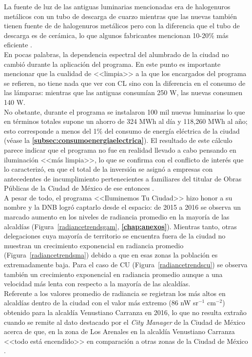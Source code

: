 La fuente de luz de las antiguas luminarias mencionadas era de halogenuros metálicos con un tubo de descarga de cuarzo mientras que las nuevas también tienen fuente de de halogenuros metálicos pero con la diferencia que el tubo de descarga es de cerámica, lo que algunos fabricantes mencionan 10-20\% más eficiente \citep{EMB2007}.\\

En pocas palabras, la dependencia espectral del alumbrado de la ciudad no cambió durante la aplicación del programa. En este punto es importante mencionar que la cualidad de <<limpia>> a la que los encargados del programa se refieren, no tiene nada que ver con CL sino con la diferencia en el consumo de las lámparas: mientras que las antiguas consumían 250 W, las nuevas consumen 140 W.\\ 

No obstante, durante el programa se instalaron 100 mil nuevas luminarias lo que en términos totales supone un ahorro de 324 MWh al día y 118,260 MWh al año; esto corresponde a menos del 1\% del consumo de energía eléctrica de la ciudad (véase la \textbf{\autoref{subsec:consumoenergiaelectrica}}). El resultado de este cálculo parece indicar que el programa no fue en realidad llevado a cabo pensando en iluminación <<más limpia>>, lo que se confirma con el conflicto de interés que lo caracterizó, en que el total de la inversión se asignó a empresas con antecedentes de incumplimiento pertenecientes a familiares del titular de Obras Públicas de la Ciudad de México de ese entonces \citep{Sinembargo2015}.\\ 

A pesar de todo, el programa <<Iluminemos Tu Ciudad>> hizo honor a su nombre y la DNB logró captarlo desde el espacio: de 2015 a 2016 se observa un marcado aumento en los niveles de radiancia promedio en la mayoría de las alcaldías (Figura~\ref{radiancetrendsgam}, \textbf{\autoref{chap:anexos}}). Mientras tanto, otras delegaciones cuya mayoría de territorio se encuentra fuera de la ciudad no muestran un crecimiento exponencial en radiancia promedio (Figura~\ref{radiancetrendsma}) debido a que en esas zonas la población es extremadamente baja. Para el caso de CU (Figura~\ref{radiancetrendscu}) se observa también un crecimiento exponencial en radiancia promedio aunque a una velocidad más lenta con respecto a la mayoría de las alcaldías.\\ 


Referente a los valores promedio de radiancia se registran los más altos en alcaldías dentro de la ciudad con el valor más extremo (86 nW sr$^{-1}$  cm$^{-2}$) obtenido para la alcaldía Venustiano Carranza en 2016, lo que no resulta extraño cuando se remite al dato destacado por el \textit{City Manager} de la Ciudad de México acerca de que, en la zona de Los Arenales en la alcaldía Venustiano Carranza <<todo está encendido>> en comparación a otras zonas de la Ciudad de México \citep{Universal2017}.\\

